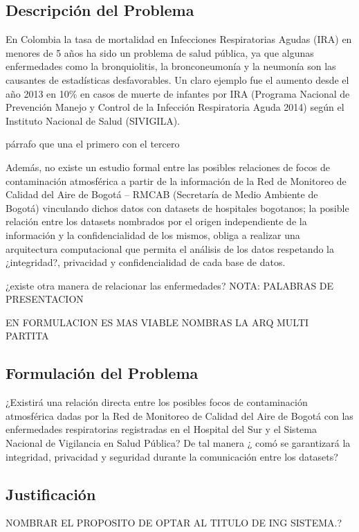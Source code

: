 \documentclass[a4paper, 11pt, oneside]{article}
\theoremstyle{definition}
\theoremstyle{remark}
\begin{document}
\subsection{Descripción del Problema}
En Colombia la tasa de mortalidad en Infecciones Respiratorias Agudas (IRA) en menores de 5 años ha sido un problema de salud pública, ya que algunas enfermedades como la bronquiolitis, la bronconeumonía y la neumonía son las causantes de estadísticas desfavorables. Un claro ejemplo fue el aumento desde el año 2013 en 10\% en casos de muerte de infantes por IRA (Programa Nacional de Prevención Manejo y Control de la Infección Respiratoria Aguda 2014) según el Instituto Nacional de  Salud (SIVIGILA). 

párrafo que una el primero con el tercero

Además, no existe un estudio formal entre las posibles relaciones de focos de contaminación atmosférica a partir de la información de la Red de Monitoreo de Calidad del Aire de Bogotá – RMCAB (Secretaría de Medio Ambiente de Bogotá) vinculando dichos datos con datasets de hospitales bogotanos; la posible relación entre los datasets nombrados por el origen independiente de la información y la confidencialidad de los mismos, obliga a realizar una arquitectura computacional que permita el análisis de los datos respetando la ¿integridad?, privacidad y confidencialidad de cada base de datos.

¿existe otra manera de relacionar las enfermedades?
NOTA: PALABRAS DE PRESENTACION

EN FORMULACION ES MAS VIABLE NOMBRAS LA ARQ MULTI PARTITA

\subsection{Formulación del Problema}
¿Existirá una relación directa entre los posibles focos de contaminación atmosférica dadas por la Red de Monitoreo de Calidad del Aire de Bogotá con las enfermedades respiratorias registradas en el Hospital del Sur y el Sistema Nacional de Vigilancia en Salud Pública? De tal manera ¿ comó se garantizará la integridad, privacidad y seguridad durante la comunicación entre los datasets?




\subsection{Justificación}
 NOMBRAR EL PROPOSITO DE OPTAR AL TITULO DE ING SISTEMA.?
\end{document}
